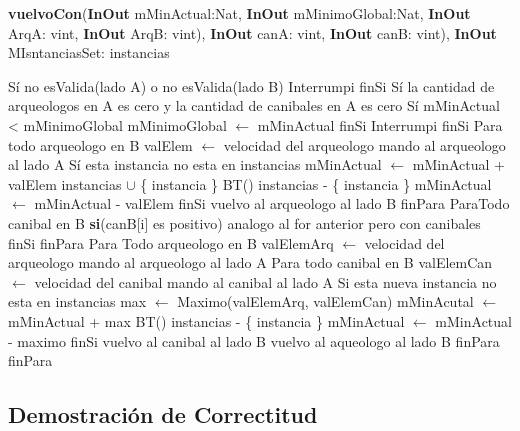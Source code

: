 \documentclass[spanish,12pt]{article}
\begin{document}
\begin{algorithm}[H]{\textbf{vuelvoCon}(\textbf{InOut} mMinActual:Nat, \textbf{InOut} mMinimoGlobal:Nat, \textbf{InOut} ArqA: vint, \textbf{InOut} ArqB: vint), \textbf{InOut} canA: vint, \textbf{InOut} canB: vint), \textbf{InOut} MIsntanciasSet: instancias}
	\begin{algorithmic}
	\State Sí no esValida(lado A) o no esValida(lado B)	
	\State \quad Interrumpi
	\State finSi
	\State Sí la cantidad de arqueologos en A es cero y la cantidad de canibales en A es cero
	\State \quad Sí mMinActual < mMinimoGlobal
	\State \qquad mMinimoGlobal $\gets$ mMinActual
	\State \quad finSi
	\State \quad Interrumpi
	\State finSi
	\State Para todo arqueologo en B 
	\State \quad valElem $\gets$ velocidad del arqueologo
	\State \quad mando al arqueologo al lado A	
	\State \quad Sí esta instancia no esta en instancias
	\State \qquad  mMinActual $\gets$ mMinActual + valElem
	\State \qquad  instancias $\cup$ \{ instancia \}
	\State \qquad  BT()
	\State \qquad  instancias - \{ instancia \}
	\State \qquad  mMinActual $\gets$ mMinActual - valElem
	\State \quad finSi
	\State \quad vuelvo al arqueologo al lado B
	\State finPara
	\State ParaTodo canibal en B
	\State \quad \textbf{si}(canB[i] es positivo)
	\State \qquad analogo al for anterior pero con canibales
	\State finSi
	\State finPara
	\State Para Todo arqueologo en B 
	\State \quad valElemArq $\gets$ velocidad del arqueologo 
	\State \quad mando al arqueologo al lado A
	\State \quad Para todo canibal en B
	\State \qquad valElemCan $\gets$ velocidad del canibal	
	\State \qquad mando al canibal al lado A
	\State \qquad  Si esta nueva instancia no esta en instancias
	\State \qquad \quad max $\gets$ Maximo(valElemArq, valElemCan)
	\State \qquad \quad mMinAcutal $\gets$ mMinActual + max
	\State \qquad \quad BT()
	\State \qquad \quad instancias - \{ instancia \}
	\State \qquad \quad mMinActual $\gets$ mMinActual - maximo
	\State \qquad finSi
	\State \qquad vuelvo al canibal al lado B
	\State \qquad vuelvo al aqueologo al lado B 
	\State \quad finPara
	\State finPara
																		
	\end{algorithmic}
\end{algorithm}


\subsection{Demostración de Correctitud}
\end{document}
